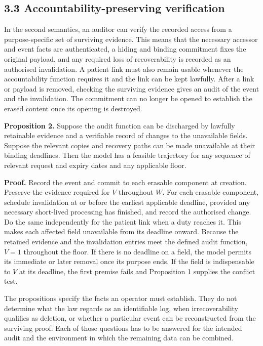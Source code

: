 \documentclass[preprint,review,12pt]{elsarticle}
\begin{document}
\hypertarget{accountability-preserving-verification}{%
\subsection{3.3 Accountability-preserving
verification}\label{accountability-preserving-verification}}

In the second semantics, an auditor can verify the recorded access from
a purpose-specific set of surviving evidence. This means that the
necessary accessor and event facts are authenticated, a hiding and
binding commitment fixes the original payload, and any required loss of
recoverability is recorded as an authorised invalidation. A patient link
must also remain usable whenever the accountability function requires it
and the link can be kept lawfully. After a link or payload is removed,
checking the surviving evidence gives an audit of the event and the
invalidation. The commitment can no longer be opened to establish the
erased content once its opening is destroyed.

\textbf{Proposition 2.} Suppose the audit function can be discharged by
lawfully retainable evidence and a verifiable record of changes to the
unavailable fields. Suppose the relevant copies and recovery paths can
be made unavailable at their binding deadlines. Then the model has a
feasible trajectory for any sequence of relevant request and expiry
dates and any applicable floor.

\textbf{Proof.} Record the event and commit to each erasable component
at creation. Preserve the evidence required for \(V\) throughout \(W\).
For each erasable component, schedule invalidation at or before the
earliest applicable deadline, provided any necessary short-lived
processing has finished, and record the authorised change. Do the same
independently for the patient link when a duty reaches it. This makes
each affected field unavailable from its deadline onward. Because the
retained evidence and the invalidation entries meet the defined audit
function, \(V = 1\) throughout the floor. If there is no deadline on a
field, the model permits its immediate or later removal once its purpose
ends. If the field is indispensable to \(V\) at its deadline, the first
premise fails and Proposition 1 supplies the conflict test.

The propositions specify the facts an operator must establish. They do
not determine what the law regards as an identifiable log, when
irrecoverability qualifies as deletion, or whether a particular event
can be reconstructed from the surviving proof. Each of those questions
has to be answered for the intended audit and the environment in which
the remaining data can be combined.
\end{document}
